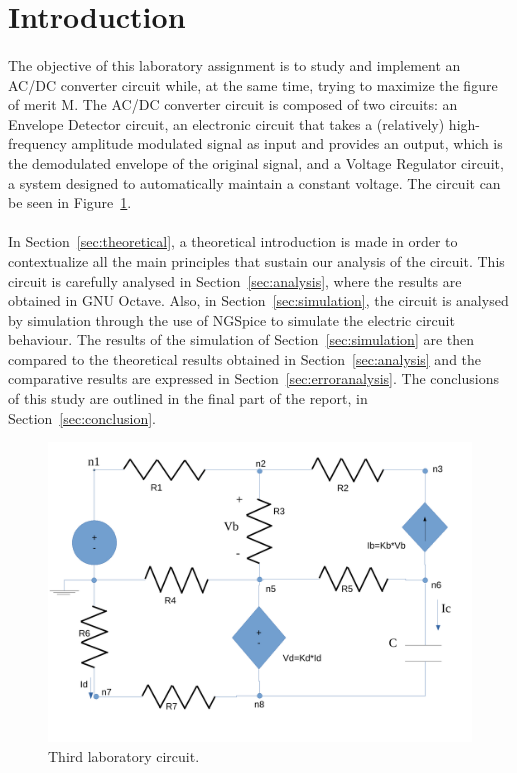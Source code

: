 \section{Introduction}
\label{sec:introduction}

\paragraph{} 
The objective of this laboratory assignment is to study and implement an AC/DC converter circuit while, at the same time, trying to maximize the figure of merit M. The AC/DC converter circuit is composed of two circuits: an Envelope Detector circuit, an electronic circuit that takes a (relatively) high-frequency amplitude modulated signal as input and provides an output, which is the demodulated envelope of the original signal, and a Voltage Regulator circuit, a system designed to automatically maintain a constant voltage.
The circuit can be seen in Figure~\ref{fig:circuit}.


\paragraph{}
In Section~\ref{sec:theoretical}, a theoretical introduction is made in order to contextualize all the main principles that sustain our analysis of the circuit. This circuit is carefully analysed in Section~\ref{sec:analysis}, where the results are obtained in GNU Octave. Also, in Section~\ref{sec:simulation}, the circuit is analysed by simulation through the use of NGSpice to simulate the electric circuit behaviour. The results of the simulation of Section~\ref{sec:simulation} are then compared to the theoretical results obtained in Section~\ref{sec:analysis} and the comparative results are expressed in Section~\ref{sec:erroranalysis}. The conclusions of this study are outlined in the final part of the report, in Section~\ref{sec:conclusion}.


\begin{figure}[h] \centering
\includegraphics[width=0.4\linewidth]{circuit.pdf}
\caption{Third laboratory circuit.}
\label{fig:circuit}
\end{figure}

